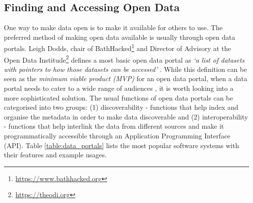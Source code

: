 \subsection{Finding and Accessing Open Data}
\label{sub:access-open-data}
One way to make data open is to make it available for others to use. The preferred method of making open data available is usually through open data portals. Leigh Dodds, chair of BathHacked\footnote{\url{https://www.bathhacked.org}} and Director of Advisory at the Open Data Institude\footnote{\url{https://theodi.org}} defines a most basic open data portal as \textit{`a list of datasets with pointers to how those datasets can be accessed'} \citep{dodds_what_2015}. While this definition can be seen as the \textit{minimum viable product (MVP)} for an open data portal, when a data portal needs to cater to a wide range of audiences \citep{davies_open_2010}, it is worth looking into a more sophisticated solution. The usual functions of open data portals can be categorised into two groups: (1) discoverability - functions that help index and organise the metadata in order to make data discoverable and (2) interoperability - functions that help interlink the data from different sources and make it programmatically accessible through an Application Programming Interface (API). Table \ref{table:data_portals} lists the most popular software systems with their features and example usages.

